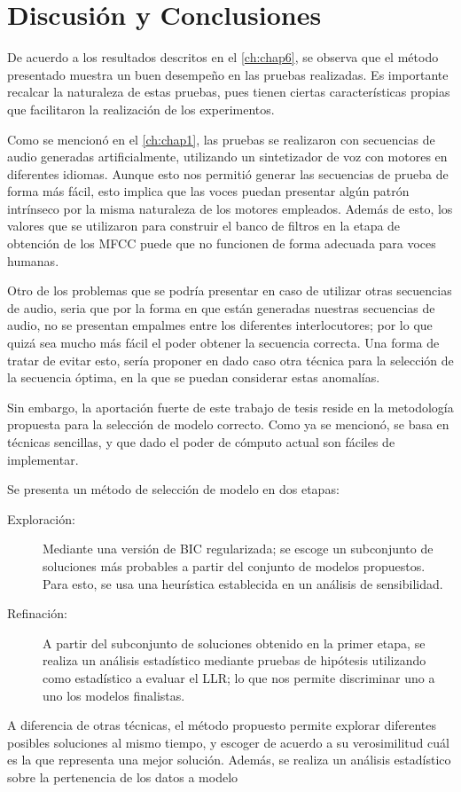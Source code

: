 
\chapter{Discusión y Conclusiones}\label{ch:chap7}

De acuerdo a los resultados descritos en el \autoref{ch:chap6}, se observa que el método presentado muestra un buen desempeño en las pruebas realizadas. Es importante recalcar la naturaleza de estas pruebas, pues tienen ciertas características propias que facilitaron la realización de los experimentos.

Como se mencionó en el \autoref{ch:chap1}, las pruebas se realizaron con secuencias de audio generadas artificialmente, utilizando un sintetizador de voz con motores en diferentes idiomas. Aunque esto nos permitió generar las secuencias de prueba de forma más fácil, esto implica que las voces puedan presentar algún patrón intrínseco por la misma naturaleza de los motores empleados. Además de esto, los valores que se utilizaron para construir el banco de filtros en la etapa de obtención de los \ac{MFCC} puede que no funcionen de forma adecuada para voces humanas.

Otro de los problemas que se podría presentar en caso de utilizar otras secuencias de audio, seria que por la forma en que están generadas nuestras secuencias de audio, no se presentan empalmes entre los diferentes interlocutores; por lo que quizá sea mucho más fácil el poder obtener la secuencia correcta. Una forma de tratar de evitar esto, sería proponer en dado caso otra técnica para la selección de la secuencia óptima, en la que se puedan considerar estas anomalías.

Sin embargo, la aportación fuerte de este trabajo de tesis reside en la metodología propuesta para la selección de modelo correcto. Como ya se mencionó, se basa en técnicas sencillas, y que dado el poder de cómputo actual son fáciles de implementar.

Se presenta un método de selección de modelo en dos etapas: 
\begin{description}
\item[Exploración:] Mediante una versión de \ac{BIC} regularizada; se escoge un subconjunto de soluciones más probables a partir del conjunto de modelos propuestos. Para esto, se usa una heurística establecida en un análisis de sensibilidad. 

\item[Refinación:] A partir del subconjunto de soluciones obtenido en la primer etapa, se realiza un análisis estadístico mediante pruebas de hipótesis utilizando como estadístico a evaluar el \ac{LLR}; lo que nos permite discriminar uno a uno los modelos finalistas.
\end{description}

A diferencia de otras técnicas, el método propuesto permite explorar diferentes posibles soluciones al mismo tiempo, y escoger de acuerdo a su verosimilitud cuál es la que representa una mejor solución. Además, se realiza un análisis estadístico sobre la pertenencia de los datos a modelo 



